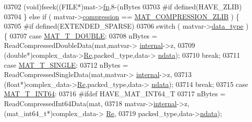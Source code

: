\begin{DoxyCode}
{{{{{{{{{{{{{{{{{{03702                         (void)fseek((FILE*)mat->\hyperlink{struct__mat__t_a85f562e407ca9ad4d2a6e14f839432b7}{fp},8-(nBytes %
03703 \textcolor{preprocessor}{#if defined(HAVE\_ZLIB)}
03704                 \} \textcolor{keywordflow}{else} \textcolor{keywordflow}{if} ( matvar->\hyperlink{group___m_a_t_aeef0466048621cb2c959ba7f6c774d06}{compression} == 
      \hyperlink{group___m_a_t_gga768c318af97bd2567758ecb001ceb7f4a5181d2f71eab0f12f05ba65d4f13fb53}{MAT\_COMPRESSION\_ZLIB} ) \{
03705 \textcolor{preprocessor}{#if defined(EXTENDED\_SPARSE)}
03706                     \textcolor{keywordflow}{switch} ( matvar->\hyperlink{group___m_a_t_ab6aafe9bd77f0f077852593dec438144}{data\_type} ) \{
03707                         \textcolor{keywordflow}{case} \hyperlink{group___m_a_t_ggacf7b3b879282b7ab3a51190e49bf3453a31e721ecf7e188196f83c32838288797}{MAT\_T\_DOUBLE}:
03708                             nBytes = ReadCompressedDoubleData(mat,matvar->
      \hyperlink{group___m_a_t_a6e97e3ed9f40c49322c18561c2a94e92}{internal}->z,
03709                                  (\textcolor{keywordtype}{double}*)complex\_data->\hyperlink{group___m_a_t_a484a93607508adac2bce53a0252e0325}{Re},packed\_type,data->
      \hyperlink{group___m_a_t_a1beb8a8c58a808207cbea650563a9b63}{ndata});
03710                             \textcolor{keywordflow}{break};
03711                         \textcolor{keywordflow}{case} \hyperlink{group___m_a_t_ggacf7b3b879282b7ab3a51190e49bf3453a3a3657d40e9212c923d9b9d03531b64c}{MAT\_T\_SINGLE}:
03712                             nBytes = ReadCompressedSingleData(mat,matvar->
      \hyperlink{group___m_a_t_a6e97e3ed9f40c49322c18561c2a94e92}{internal}->z,
03713                                  (\textcolor{keywordtype}{float}*)complex\_data->\hyperlink{group___m_a_t_a484a93607508adac2bce53a0252e0325}{Re},packed\_type,data->
      \hyperlink{group___m_a_t_a1beb8a8c58a808207cbea650563a9b63}{ndata});
03714                             \textcolor{keywordflow}{break};
03715                         \textcolor{keywordflow}{case} \hyperlink{group___m_a_t_ggacf7b3b879282b7ab3a51190e49bf3453a9e825b5d18b8f946eaf2b4b57e51c145}{MAT\_T\_INT64}:
03716 \textcolor{preprocessor}{#ifdef HAVE\_MAT\_INT64\_T}
03717                             nBytes = ReadCompressedInt64Data(mat,
03718                                 matvar->\hyperlink{group___m_a_t_a6e97e3ed9f40c49322c18561c2a94e92}{internal}->z,(mat\_int64\_t*)complex\_data->
      \hyperlink{group___m_a_t_a484a93607508adac2bce53a0252e0325}{Re},
03719                                 packed\_type,data->\hyperlink{group___m_a_t_a1beb8a8c58a808207cbea650563a9b63}{ndata});
}}}}}}}}}}}}}}}}}}
\end{DoxyCode}
